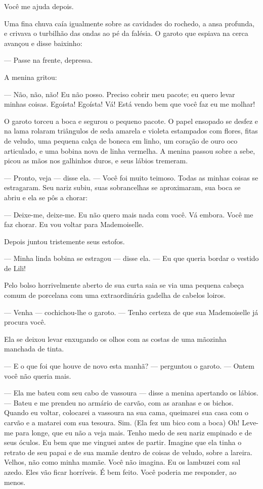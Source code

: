 Você me ajuda depois.

Uma fina chuva caía igualmente sobre as cavidades do rochedo, a ansa
profunda, e crivava o turbilhão das ondas ao pé da falésia. O garoto que
espiava na cerca avançou e disse baixinho:

--- Passe na frente, depressa.

A menina gritou:

--- Não, não, não! Eu não posso. Preciso cobrir meu pacote; eu quero
levar minhas coisas. Egoísta! Egoísta! Vá! Está vendo bem que você faz
eu me molhar!

O garoto torceu a boca e segurou o pequeno pacote. O papel ensopado se
desfez e na lama rolaram triângulos de seda amarela e violeta estampados
com flores, fitas de veludo, uma pequena calça de boneca em linho, um
coração de ouro oco articulado, e uma bobina nova de linha vermelha. A
menina passou sobre a sebe, picou as mãos nos galhinhos duros, e seus
lábios tremeram.

--- Pronto, veja --- disse ela. --- Você foi muito teimoso. Todas as minhas
coisas se estragaram. Seu nariz subiu, suas sobrancelhas se aproximaram,
sua boca se abriu e ela se pôs a chorar:

--- Deixe-me, deixe-me. Eu não quero mais nada com você. Vá embora. Você
me faz chorar. Eu vou voltar para Mademoiselle.

Depois juntou tristemente seus estofos.

--- Minha linda bobina se estragou --- disse ela. --- Eu que queria bordar o
vestido de Lili!

Pelo bolso horrivelmente aberto de sua curta saia se via uma pequena
cabeça comum de porcelana com uma extraordinária gadelha de cabelos
loiros.

--- Venha --- cochichou-lhe o garoto. --- Tenho certeza de que sua Mademoiselle
já procura você.

Ela se deixou levar enxugando os olhos com as costas de uma mãozinha
manchada de tinta.

--- E o que foi que houve de novo esta manhã? --- perguntou o garoto. --- Ontem
você não queria mais.

--- Ela me bateu com seu cabo de vassoura --- disse a menina apertando os
lábios. --- Bateu e me prendeu no armário de carvão, com as aranhas e os bichos.
Quando eu voltar, colocarei a vassoura na sua cama, queimarei sua casa com
o carvão e a matarei com sua tesoura. Sim. (Ela fez um bico com a boca)
Oh! Leve-me para longe, que eu não a veja mais. Tenho medo de seu nariz
empinado e de seus óculos. Eu bem que me vinguei antes de partir. Imagine que
ela tinha o retrato de seu papai e de sua mamãe dentro de coisas de
veludo, sobre a lareira. Velhos, não como minha mamãe. Você não imagina.
Eu os lambuzei com sal azedo. Eles vão ficar horríveis. É bem
feito. Você poderia me responder, ao menos.

